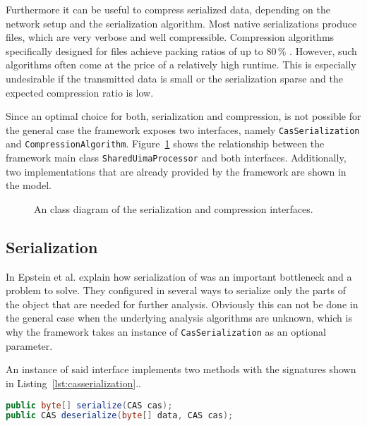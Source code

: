 Furthermore it can be useful to compress serialized data, depending on the network setup and the serialization algorithm. Most native \uima{} serializations produce \xml{} files, which are very verbose and well compressible. Compression algorithms specifically designed for \xml{} files achieve packing ratios of up to 80\,\% \cite{girardot2005system,min2003xpress,sakr2009xml}. However, such algorithms often come at the price of a relatively high runtime. This is especially undesirable if the transmitted data is small or the serialization sparse and the expected compression ratio is low.

Since an optimal choice for both, serialization and compression, is not possible for the general case the framework exposes two interfaces, namely \lstinline|CasSerialization| and \lstinline|CompressionAlgorithm|. Figure~\ref{fig:interfaces} shows the relationship between the framework main class \lstinline|SharedUimaProcessor| and both interfaces. Additionally, two implementations that are already provided by the framework are shown in the model.


\begin{figure}[htb]
	\centering
	\resizebox{\linewidth}{!}{\small}
	\caption[An UML class diagram of the serialization and compression interfaces.]{An \uml{} class diagram of the serialization and compression interfaces.}
	\label{fig:interfaces}
\end{figure}
\subsection{Serialization}
In \cite{epstein2012making} Epstein et al. explain how serialization of \cas{} was an important bottleneck and a problem to solve. They configured \uimaas{} in several ways to serialize only the parts of the \cas{} object that are needed for further analysis. Obviously this can not be done in the general case when the underlying analysis algorithms are unknown, which is why the framework takes an instance of \lstinline|CasSerialization| as an optional parameter.

An instance of said interface implements two methods with the signatures shown in Listing~\ref{lst:casserialization}..
\begin{lstlisting}[language=Java,caption={CasSerialization method signatures},label=lst:casserialization]
public byte[] serialize(CAS cas);
public CAS deserialize(byte[] data, CAS cas);
\end{lstlisting}

